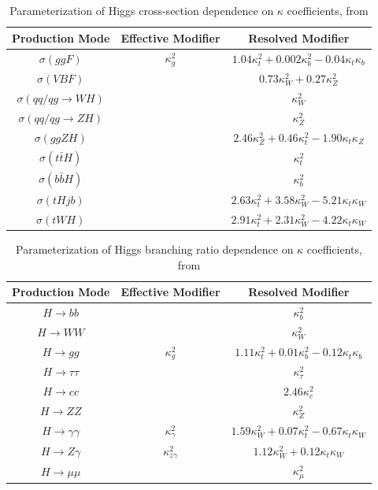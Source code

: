 \begin{table}[h]
    \centering
    \begin{tabular}{ccc}
	Production Mode & Effective Modifier & Resolved Modifier \\ \hline
	$\sigma(ggF)$ & $\kappa_{g}^{2}$ & $1.04 \kappa_{t}^{2} + 0.002 \kappa_{b}^2 - 0.04 \kappa_{t} \kappa_{b}$ \\
	$\sigma(VBF)$ & & $0.73 \kappa_{W}^{2} + 0.27 \kappa_{Z}^2$ \\
	$\sigma(qq/qg \rightarrow W H)$ & & $\kappa_{W}^{2}$ \\
	$\sigma(qq/qg \rightarrow ZH)$ & & $\kappa_{Z}^{2}$\\
	$\sigma(ggZH)$ && $2.46 \kappa_{Z}^{2} + 0.46 \kappa_{t}^2 - 1.90 \kappa_{t} \kappa_{Z}$ \\
	$\sigma(t\bar{t}H)$ && $\kappa_{t}^{2}$ \\
	$\sigma(b\bar{b}H)$ && $\kappa_{b}^{2}$ \\
	$\sigma(tHjb)$ && $2.63 \kappa_{t}^{2} + 3.58 \kappa_{W}^2 - 5.21 \kappa_{t} \kappa_{W}$ \\
	$\sigma(tWH)$ && $2.91 \kappa_{t}^{2} + 2.31 \kappa_{W}^2 - 4.22 \kappa_{t} \kappa_{W}$ \\
    \end{tabular}
    \caption{Parameterization of Higgs cross-section dependence on $\kappa$ coefficients, from \cite{PhysRevD.101.012002}}
    \label{tab:Xsecskappa}
\end{table}

\begin{table}[h]
    \centering
    \begin{tabular}{ccc}
	Production Mode & Effective Modifier & Resolved Modifier \\ \hline
	$H \rightarrow bb$ & & $\kappa_{b}^2$ \\
	$H \rightarrow WW$ & & $\kappa_{W}^{2}$ \\
	$H \rightarrow gg$ & $\kappa_{g}^{2}$ & $1.11 \kappa_{t}^{2} + 0.01 \kappa_{b}^2 - 0.12 \kappa_{t} \kappa_{b}$ \\
	$H \rightarrow \tau \tau$ & & $\kappa_{\tau}^{2}$ \\
	$H \rightarrow cc$ && $2.46 \kappa_{c}^{2}$ \\
	$H \rightarrow ZZ$ && $\kappa_{Z}^{2}$ \\
	$H \rightarrow \gamma \gamma$ & $\kappa_{\gamma}^{2}$ & $1.59 \kappa_{W}^{2} + 0.07 \kappa_{t}^2 - 0.67 \kappa_{t} \kappa_{W}$ \\
	$H \rightarrow Z \gamma$ & $\kappa_{z \gamma}^{2}$ & $1.12 \kappa_{W}^{2} + 0.12 \kappa_{t} \kappa_{W}$ \\
	$H \rightarrow \mu \mu$ && $\kappa_{\mu}^{2}$ \\
    \end{tabular}
    \caption{Parameterization of Higgs branching ratio dependence on $\kappa$ coefficients, from \cite{PhysRevD.101.012002}}
    \label{tab:BRskappa}
\end{table}

